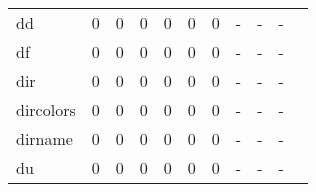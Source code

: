 \begin{longtable}{lp{1.20cm}p{1.20cm}p{1.20cm}p{1.20cm}p{1.20cm}p{1.20cm}p{1.20cm}p{1.20cm}p{1.20cm}p{1.20cm}}
dd        &                                     0 &                                                  0 &                                                  0 &                                                  0 &                                                  0 &                                                  0 &                                             - &                                                  - &                                                  - \\
df        &                                     0 &                                                  0 &                                                  0 &                                                  0 &                                                  0 &                                                  0 &                                             - &                                                  - &                                                  - \\
dir       &                                     0 &                                                  0 &                                                  0 &                                                  0 &                                                  0 &                                                  0 &                                             - &                                                  - &                                                  - \\
dircolors &                                     0 &                                                  0 &                                                  0 &                                                  0 &                                                  0 &                                                  0 &                                             - &                                                  - &                                                  - \\
dirname   &                                     0 &                                                  0 &                                                  0 &                                                  0 &                                                  0 &                                                  0 &                                             - &                                                  - &                                                  - \\
du        &                                     0 &                                                  0 &                                                  0 &                                                  0 &                                                  0 &                                                  0 &                                             - &                                                  - &                                                  - \\

\end{longtable}
